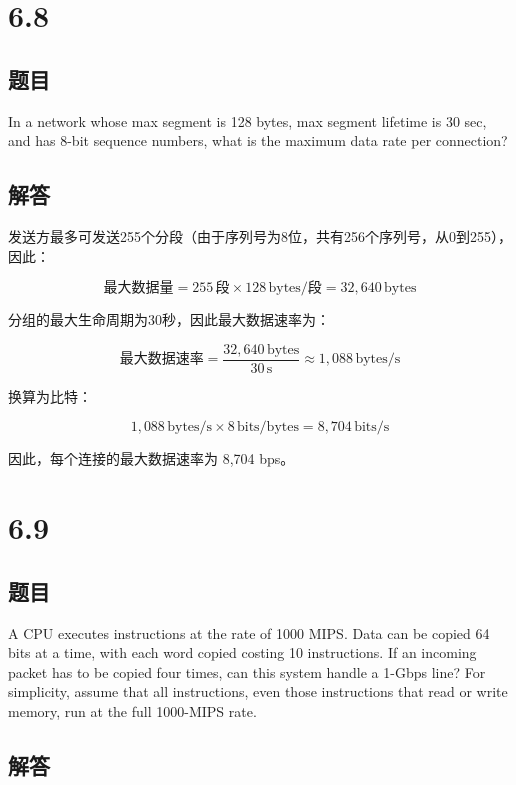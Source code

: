 \documentclass[14pt,a4paper,UTF8,twoside]{article}
\begin{document}
\section{6.8}

\subsection*{题目}

In a network whose max segment is 128 bytes, max segment lifetime is 30 sec, and has 8-bit sequence numbers, what is the maximum data rate per connection?

\subsection*{解答}

\begin{ans}{6.8}{6.8}
发送方最多可发送255个分段（由于序列号为8位，共有256个序列号，从0到255），因此：

\[
\text{最大数据量} = 255 \, \text{段} \times 128 \, \text{bytes/段} = 32,640 \, \text{bytes}
\]

分组的最大生命周期为30秒，因此最大数据速率为：

\[
\text{最大数据速率} = \frac{32,640 \, \text{bytes}}{30 \, \text{s}} \approx 1,088 \, \text{bytes/s}
\]

换算为比特：

\[
1,088 \, \text{bytes/s} \times 8 \, \text{bits/bytes} = 8,704 \, \text{bits/s}
\]

因此，每个连接的最大数据速率为 8,704 bps。
\end{ans}

\section{6.9}

\subsection*{题目}

A CPU executes instructions at the rate of 1000 MIPS. Data can be copied 64 bits at a time, with each word copied costing 10 instructions. If an incoming packet has to be copied four times, can this system handle a 1-Gbps line? For simplicity, assume that all instructions, even those instructions that read or write memory, run at the full 1000-MIPS rate.

\subsection*{解答}
\end{document}
